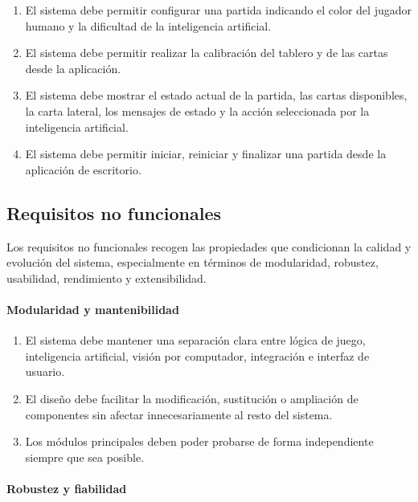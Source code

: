 \begin{enumerate}[label=\textbf{RF-\twodigits*:}, leftmargin=2.2cm, resume]
    \item El sistema debe permitir configurar una partida indicando el color del jugador humano y la dificultad de la inteligencia artificial.

    \item El sistema debe permitir realizar la calibración del tablero y de las cartas desde la aplicación.

    \item El sistema debe mostrar el estado actual de la partida, las cartas disponibles, la carta lateral, los mensajes de estado y la acción seleccionada por la inteligencia artificial.

    \item El sistema debe permitir iniciar, reiniciar y finalizar una partida desde la aplicación de escritorio.
\end{enumerate}


\subsection{Requisitos no funcionales}

Los requisitos no funcionales recogen las propiedades que condicionan la calidad y evolución del sistema, especialmente en términos de modularidad, robustez, usabilidad, rendimiento y extensibilidad.

\paragraph{Modularidad y mantenibilidad}

\begin{enumerate}[label=\textbf{RNF-\twodigits*:}, leftmargin=2.5cm]
    \item El sistema debe mantener una separación clara entre lógica de juego, inteligencia artificial, visión por computador, integración e interfaz de usuario.

    \item El diseño debe facilitar la modificación, sustitución o ampliación de componentes sin afectar innecesariamente al resto del sistema.

    \item Los módulos principales deben poder probarse de forma independiente siempre que sea posible.
\end{enumerate}

\paragraph{Robustez y fiabilidad}

